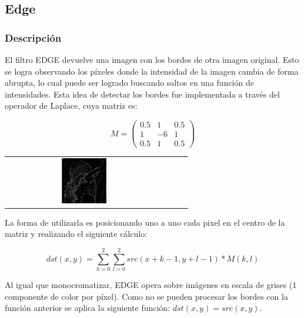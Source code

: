 \subsection{Edge}

\subsubsection{Descripción}

\begin{multicols}{2}
El filtro EDGE devuelve una imagen con los bordes de otra imagen original. Esto se logra observando los píxeles donde la intensidad de la imagen cambia de forma abrupta, lo cual puede ser logrado buscando saltos en una función de intensidades. Esta idea de detectar los bordes fue implementada a través del operador de Laplace, cuya matriz es: 

$$ M = \left(
\begin{matrix}
    0.5 & 1 & 0.5 \\
    1 & -6 & 1 \\
    0.5 & 1 & 0.5
\end{matrix}
\right)$$

\begin{center}
	\begin{tabular}{cccc}
		\includegraphics[width=0.3\textwidth]{imagenes/lenaEDGA.jpg} \\
		\end{tabular}
	\end{center}
\end{multicols}

La forma de utilizarla es posicionando uno a uno cada pixel en el centro de la matriz y realizando el siguiente cálculo: 

$$dst(x, y) = \sum_{k = 0}^2 \sum_{l = 0}^2 src(x + k - 1, y + l - 1) * M(k, l)$$

Al igual que monocromatizar, EDGE opera sobre imágenes en escala de grises (1 componente de color por píxel).
Como no se pueden procesar los bordes con la función anterior se aplica la siguiente función: $dst(x, y) = src(x,y)$.

